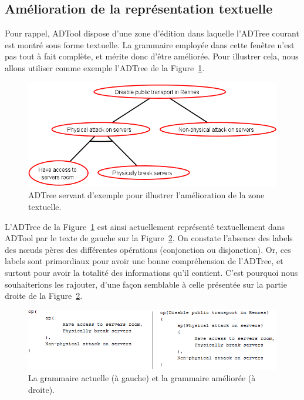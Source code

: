 	\subsection{Amélioration de la représentation textuelle}

		Pour rappel, ADTool dispose d'une zone d'édition dans laquelle l'ADTree courant est montré sous forme textuelle. La grammaire employée dans cette fenêtre n'est pas tout à fait complète, et mérite donc d'être améliorée. Pour illustrer cela, nous allons utiliser comme exemple l'ADTree de la {\sc Figure}~\ref{fig:arbre_ex}.

		\begin{figure}[H]
	        \centering
	        \includegraphics[height=0.4\textwidth]{figure/tree.png}
	        \caption{ADTree servant d'exemple pour illustrer l'amélioration de la zone textuelle.}
	        \label{fig:arbre_ex}
	    \end{figure}

	    L'ADTree de la {\sc Figure}~\ref{fig:arbre_ex} est ainsi actuellement représenté textuellement dans ADTool par le texte de gauche sur la {\sc Figure}~\ref{fig:grams}. On constate l'absence des labels des nœuds pères des différentes opérations (conjonction ou disjonction). Or, ces labels sont primordiaux pour avoir une bonne compréhension de l'ADTree, et surtout pour avoir la totalité des informations qu'il contient. C'est pourquoi nous souhaiterions les rajouter, d'une façon semblable à celle présentée sur la partie droite de la {\sc Figure}~\ref{fig:grams}.

	    \begin{figure}[H]
	        \centering
	        \includegraphics[width=\textwidth]{figure/grams.png}
	        \caption{La grammaire actuelle (à gauche) et la grammaire améliorée (à droite).}
	        \label{fig:grams}
	    \end{figure}

